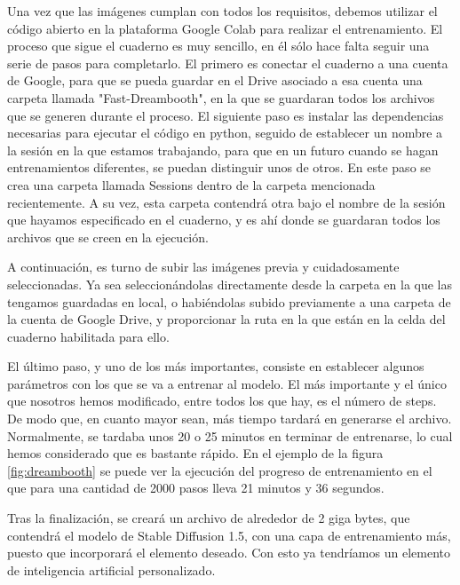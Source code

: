 Una vez que las imágenes cumplan con todos los requisitos, debemos utilizar el código abierto en la plataforma Google Colab para realizar el entrenamiento. 
El proceso que sigue el cuaderno es muy sencillo, en él sólo hace falta seguir una serie de pasos para completarlo. El primero es conectar el cuaderno a una cuenta de Google, para que se pueda guardar en el Drive asociado a esa cuenta una carpeta llamada "Fast-Dreambooth", en la que se guardaran todos los archivos que se generen durante el proceso. El siguiente paso es instalar las dependencias necesarias para ejecutar el código en python, seguido de establecer un nombre a la sesión en la que estamos trabajando, para que en un futuro cuando se hagan entrenamientos diferentes, se puedan distinguir unos de otros. En este paso se crea una carpeta llamada Sessions dentro de la carpeta mencionada recientemente. A su vez, esta carpeta contendrá otra bajo el nombre de la sesión que hayamos especificado en el cuaderno, y es ahí donde se guardaran todos los archivos que se creen en la ejecución. 

A continuación, es turno de subir las imágenes previa y cuidadosamente seleccionadas. Ya sea seleccionándolas directamente desde la carpeta en la que las tengamos guardadas en local, o habiéndolas subido previamente a una carpeta de la cuenta de Google Drive, y proporcionar la ruta en la que están en la celda del cuaderno habilitada para ello. 

El último paso, y uno de los más importantes, consiste en establecer algunos parámetros con los que se va a entrenar al modelo. El más importante y el único que nosotros hemos modificado, entre todos los que hay, es el número de steps. De modo que, en cuanto mayor sean, más tiempo tardará en generarse el archivo. Normalmente, se tardaba unos 20 o 25 minutos en terminar de entrenarse, lo cual hemos considerado que es bastante rápido. En el ejemplo de la figura \ref{fig:dreambooth} se puede ver la ejecución del progreso de entrenamiento en el que para una cantidad de 2000 pasos lleva 21 minutos y 36 segundos. 

Tras la finalización, se creará un archivo de alrededor de 2 giga bytes, que contendrá el modelo de Stable Diffusion 1.5, con una capa de entrenamiento más, puesto que incorporará el elemento deseado. Con esto ya tendríamos un elemento de inteligencia artificial personalizado.\\

